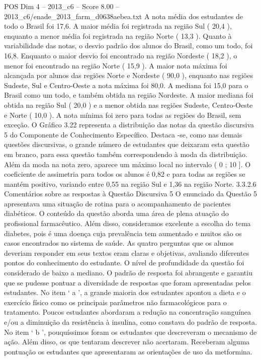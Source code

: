 \begin{textsample}{POS Dim 4 – 2013\_c6 – Score 8.00 – 2013\_c6/enade\_2013\_farm\_d0638aebea.txt}
A nota média dos estudantes de todo o Brasil foi 17,6.
A maior média foi registrada na região Sul ( 20,4 ), enquanto a menor média foi registrada na região Norte ( 13,3 ).
Quanto à variabilidade das notas, o desvio padrão dos alunos do Brasil, como um todo, foi 16,8.
Enquanto o maior desvio foi encontrado na região Nordeste ( 18,2 ), o menor foi encontrado na região Norte ( 15,9 ).
A maior nota máxima foi alcançada por alunos das regiões Norte e Nordeste ( 90,0 ), enquanto nas regiões Sudeste, Sul e Centro-Oeste a nota máxima foi 80,0.
A mediana foi 15,0 para o Brasil como um todo, e também obtida na região Nordeste.
A maior mediana foi obtida na região Sul ( 20,0 ) e a menor obtida nas regiões Sudeste, Centro-Oeste e Norte ( 10,0 ).
A nota mínima foi zero para todas as regiões do Brasil, sem exceção.
O Gráfico 3.22 representa a distribuição das notas da questão discursiva 5 do Componente de Conhecimento Específico.
Destaca -se, como nas demais questões discursivas, o grande número de estudantes que deixaram esta questão em branco, para essa questão também correspondendo à moda da distribuição.
Além da moda na nota zero, aparece um máximo local no intervalo ( 0 ; 10 ].
O coeficiente de assimetria para todos os alunos é 0,82 e para todas as regiões se mantém positivo, variando entre 0,55 na região Sul e 1,36 na região Norte. 3.3.2.6 Comentários sobre as respostas à Questão Discursiva 5 O enunciado da Questão 5 apresentava uma situação de rotina para o acompanhamento de pacientes diabéticos.
O conteúdo da questão aborda uma área de plena atuação do profissional farmacêutico.
Além disso, consideramos excelente a escolha do tema diabetes, pois é uma doença cuja prevalência tem aumentado e muitos são os casos encontrados no sistema de saúde.
As quatro perguntas que os alunos deveriam responder em seus textos eram claras e objetivas, avaliando diferentes pontos do conhecimento do estudante.
O nível de profundidade da questão foi considerado de baixo a mediano.
O padrão de resposta foi abrangente e garantiu que se pudesse pontuar a diversidade de respostas que foram apresentadas pelos estudantes.
No item ‘ a ’, a grande maioria dos estudantes apontou a dieta e o exercício físico como os principais parâmetros não farmacológicos para o tratamento.
Poucos estudantes abordaram a redução na concentração sanguínea e/ou a diminuição da resistência à insulina, como constava do padrão de resposta.
No item ‘ b ’, pouquíssimos foram os estudantes que descreveram o mecanismo de ação.
Além disso, os que tentaram descrever não acertaram.
Receberam alguma pontuação os estudantes que apresentaram as orientações de uso da metformina.

\end{textsample}
